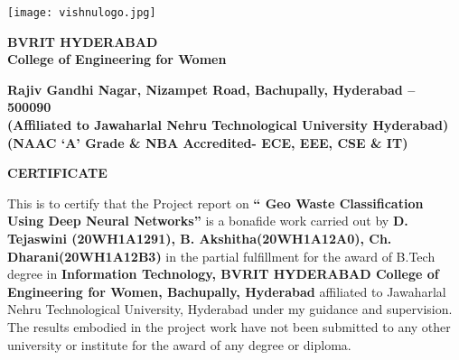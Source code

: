 \documentclass[12pt, English]{article}
\newcommand\tab[1][1cm]{\hspace*{#1}}
\begin{document}
\begin{titlepage}
\vspace*{-0.5in}
\begin{center}
\texttt{[image: vishnulogo.jpg]}
\end{center}
\begin{center}
\begin{large}
\textbf{BVRIT HYDERABAD\\ College of Engineering for Women}\\
\end{large}
\begin{footnotesize}
\textbf{ Rajiv Gandhi Nagar, Nizampet Road, Bachupally, Hyderabad – 500090}\\
\vspace*{0.1in}
\textbf{(Affiliated to Jawaharlal Nehru Technological University Hyderabad)}\\
\textbf{(NAAC ‘A’ Grade \& NBA Accredited- ECE, EEE, CSE \& IT)}\\
\end{footnotesize}
\end{center}
\begin{center}
\textbf{\large CERTIFICATE}\\
\end{center}

\begin{normalsize}

This is to certify that the Project report on {\textbf{“ Geo Waste Classification Using Deep Neural Networks”}} is a bonafide work carried out by {\textbf{D. Tejaswini (20WH1A1291), B. Akshitha(20WH1A12A0), Ch. Dharani(20WH1A12B3)}} in the
partial fulfillment for the award of B.Tech degree in \textbf{Information Technology, BVRIT
HYDERABAD College of Engineering for Women, Bachupally, Hyderabad} affiliated to Jawaharlal
Nehru Technological University, Hyderabad under my guidance and supervision.
\newline
\tab The results embodied in the project work have not been submitted to any other university or
institute for the award of any degree or diploma.
\end{normalsize}



\end{titlepage}
\end{document}
